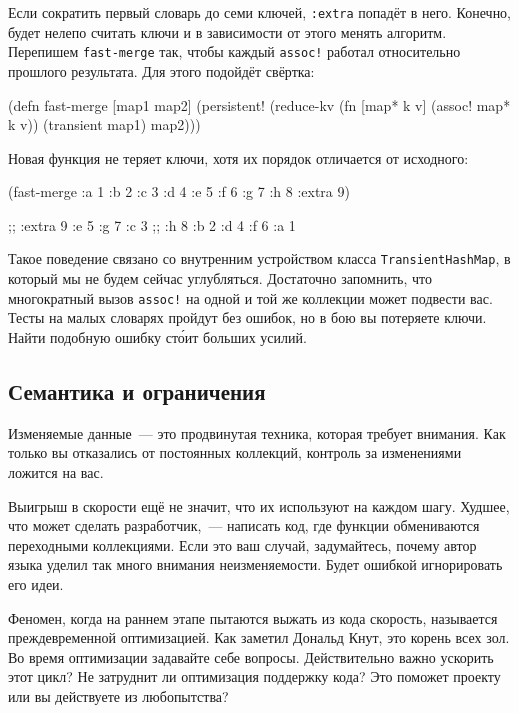 Если сократить первый словарь до семи ключей, \verb|:extra| попадёт в
него. Конечно, будет нелепо считать ключи и в зависимости от этого менять
алгоритм. Перепишем \verb|fast-merge| так, чтобы каждый \verb|assoc!| работал
относительно прошлого результата. Для этого подойдёт свёртка:

\begin{english}
  \begin{clojure}
(defn fast-merge [map1 map2]
  (persistent!
   (reduce-kv
    (fn [map* k v]
      (assoc! map* k v))
    (transient map1)
    map2)))
  \end{clojure}
\end{english}

Новая функция не теряет ключи, хотя их порядок отличается от исходного:

\begin{english}
  \begin{clojure}
(fast-merge
 {:a 1 :b 2 :c 3 :d 4 :e 5 :f 6 :g 7 :h 8}
 {:extra 9})

;; {:extra 9 :e 5 :g 7 :c 3
;;  :h 8 :b 2 :d 4 :f 6 :a 1}
  \end{clojure}
\end{english}

Такое поведение связано со внутренним устройством класса
\texttt{Tran\-si\-ent\-Hash\-Map}, в который мы не будем сейчас
углубляться. Достаточно запомнить, что многократный вызов \verb|assoc!| на одной
и той же коллекции может подвести вас. Тесты на малых словарях пройдут без
ошибок, но в бою вы потеряете ключи. Найти подобную ошибку ст\'{о}ит больших усилий.

\subsection{Семантика и ограничения}

Изменяемые данные~--- это продвинутая техника, которая требует внимания. Как только
вы отказались от постоянных коллекций, контроль за изменениями ложится на вас.

Выигрыш в скорости ещё не значит, что их используют на каждом шагу. Худшее, что
может сделать разработчик,~--- написать код, где функции обмениваются
переходными коллекциями. Если это ваш случай, задумайтесь, почему автор языка
уделил так много внимания неизменяемости. Будет ошибкой игнорировать его идеи.


Феномен, когда на раннем этапе пытаются выжать из кода скорость, называется
преждевременной оптимизацией. Как заметил Дональд Кнут, это корень всех зол. Во
время оптимизации задавайте себе вопросы. Действительно важно ускорить этот
цикл? Не затруднит ли оптимизация поддержку кода? Это поможет проекту или вы
действуете из любопытства?

